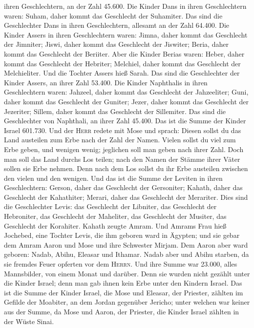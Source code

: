 ihren Geschlechtern, an der Zahl 45.600.  Die Kinder Dans
in ihren Geschlechtern waren: Suham, daher kommt das Geschlecht der
Suhamiter.  Das sind die Geschlechter Dans in ihren
Geschlechtern, allesamt an der Zahl 64.400.  Die Kinder
Assers in ihren Geschlechtern waren: Jimna, daher kommt das Geschlecht
der Jimniter; Jiswi, daher kommt das Geschlecht der Jiswiter; Beria,
daher kommt das Geschlecht der Beriiter.  Aber die Kinder
Berias waren: Heber, daher kommt das Geschlecht der Hebriter; Melchiel,
daher kommt das Geschlecht der Melchieliter.  Und die
Tochter Assers hieß Sarah.  Das sind die Geschlechter der
Kinder Assers, an ihrer Zahl 53.400.  Die Kinder
Naphthalis in ihren Geschlechtern waren: Jahzeel, daher kommt das
Geschlecht der Jahzeeliter; Guni, daher kommt das Geschlecht der
Guniter;  Jezer, daher kommt das Geschlecht der
Jezeriter; Sillem, daher kommt das Geschlecht der Sillemiter.
 Das sind die Geschlechter von Naphthali, an ihrer Zahl
45.400.  Das ist die Summe der Kinder Israel 601.730.
 Und der \textsc{Herr} redete mit Mose und sprach:
 Diesen sollst du das Land austeilen zum Erbe nach der
Zahl der Namen.  Vielen sollst du viel zum Erbe geben,
und wenigen wenig; jeglichen soll man geben nach ihrer Zahl.
 Doch man soll das Land durchs Los teilen; nach den Namen
der Stämme ihrer Väter sollen sie Erbe nehmen.  Denn nach
dem Los sollst du ihr Erbe austeilen zwischen den vielen und den
wenigen.  Und das ist die Summe der Leviten in ihren
Geschlechtern: Gerson, daher das Geschlecht der Gersoniter; Kahath,
daher das Geschlecht der Kahathiter; Merari, daher das Geschlecht der
Merariter.  Dies sind die Geschlechter Levis: das
Geschlecht der Libniter, das Geschlecht der Hebroniter, das Geschlecht
der Maheliter, das Geschlecht der Musiter, das Geschlecht der Korahiter.
Kahath zeugte Amram.  Und Amrams Frau hieß Jochebed, eine
Tochter Levis, die ihm geboren ward in Ägypten; und sie gebar dem Amram
Aaron und Mose und ihre Schwester Mirjam.  Dem Aaron aber
ward geboren: Nadab, Abihu, Eleasar und Ithamar.  Nadab
aber und Abihu starben, da sie fremdes Feuer opferten vor dem
\textsc{Herrn}.  Und ihre Summe war 23.000, alles
Mannsbilder, von einem Monat und darüber. Denn sie wurden nicht gezählt
unter die Kinder Israel; denn man gab ihnen kein Erbe unter den Kindern
Israel.  Das ist die Summe der Kinder Israel, die Mose
und Eleasar, der Priester, zählten im Gefilde der Moabiter, an dem
Jordan gegenüber Jericho;  unter welchen war keiner aus
der Summe, da Mose und Aaron, der Priester, die Kinder Israel zählten in
der Wüste Sinai.

